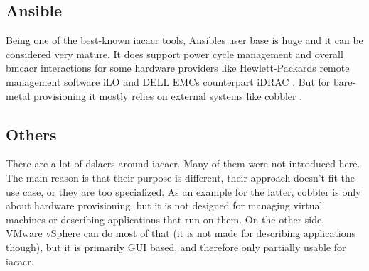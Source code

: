 \subsection{Ansible}
Being one of the best-known \gls{iacacr} tools, Ansibles user base is huge and it can be considered very mature. It does support power cycle management and overall \gls{bmcacr} interactions for some hardware providers like Hewlett-Packards remote management software iLO and DELL EMCs counterpart iDRAC \cite{ansible_hpilo} \cite{ansible_idrac}. But for  bare-metal provisioning it mostly relies on external systems like cobbler \cite{ansible_cobbler}.

\subsection{Others}
There are a lot of \gls{dslacr}s around \gls{iacacr}. Many of them were not introduced here. The main reason is that their purpose is different, their approach doesn't fit the use case, or they are too specialized. As an example for the latter, cobbler is only about hardware provisioning, but it is not designed for managing virtual machines or describing applications that run on them. On the other side, VMware vSphere can do most of that (it is not made for describing applications though), but it is primarily GUI based, and therefore only partially usable for \gls{iacacr}.


